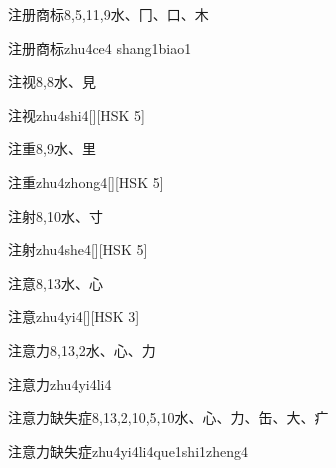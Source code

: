 \begin{Entry}{注册商标}{8,5,11,9}{⽔、⼌、⼝、⽊}
  \begin{Phonetics}{注册商标}{zhu4ce4 shang1biao1}
  \end{Phonetics}
\end{Entry}

\begin{Entry}{注视}{8,8}{⽔、⾒}
  \begin{Phonetics}{注视}{zhu4shi4}[][HSK 5]
  \end{Phonetics}
\end{Entry}

\begin{Entry}{注重}{8,9}{⽔、⾥}
  \begin{Phonetics}{注重}{zhu4zhong4}[][HSK 5]
  \end{Phonetics}
\end{Entry}

\begin{Entry}{注射}{8,10}{⽔、⼨}
  \begin{Phonetics}{注射}{zhu4she4}[][HSK 5]
  \end{Phonetics}
\end{Entry}

\begin{Entry}{注意}{8,13}{⽔、⼼}
  \begin{Phonetics}{注意}{zhu4yi4}[][HSK 3]
  \end{Phonetics}
\end{Entry}

\begin{Entry}{注意力}{8,13,2}{⽔、⼼、⼒}
  \begin{Phonetics}{注意力}{zhu4yi4li4}
  \end{Phonetics}
\end{Entry}

\begin{Entry}{注意力缺失症}{8,13,2,10,5,10}{⽔、⼼、⼒、⽸、⼤、⽧}
  \begin{Phonetics}{注意力缺失症}{zhu4yi4li4que1shi1zheng4}
  \end{Phonetics}
\end{Entry}


